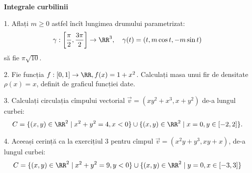 \vspace{0.3cm}

\textbf{Integrale curbilinii}

1. Aflați $ m \geq 0 $ astfel încît lungimea drumului parametrizat:
\[
    \gamma : \left[ \dfrac{\pi}{2}, \dfrac{3\pi}{2} \right] \to \RR^3, \quad %
    \gamma(t) = (t, m\cos t, -m\sin t)  
\]
să fie $ \pi \sqrt{10} $.

\vspace{0.3cm}

2. Fie funcția $ f : [0, 1] \to \RR, f(x) = 1 + x^2 $. Calculați masa
unui fir de densitate $ \rho(x) = x $, definit de graficul funcției date.

\vspace{0.3cm}

3. Calculați circulația cîmpului vectorial $ \vec{v} = (xy^2 + x^3, x + y^2) $
de-a lungul curbei:
\[
    C = \{ (x, y) \in \RR^2 \mid x^2 + y^2 = 4, x < 0 \} \cup %
    \{ (x, y) \in \RR^2 \mid x = 0, y \in [-2, 2] \}.
\]

\vspace{0.3cm}

4. Aceeași cerință ca la exercițiul 3 pentru cîmpul $ \vec{v} = (x^2y + y^3, xy + x) $,
de-a lungul curbei:
\[
    C = \{ (x, y) \in \RR^2 \mid x^2 + y^2 = 9, y < 0 \} \cup %
    \{ (x, y) \in \RR^2 \mid y = 0, x \in [-3, 3] \}
\]